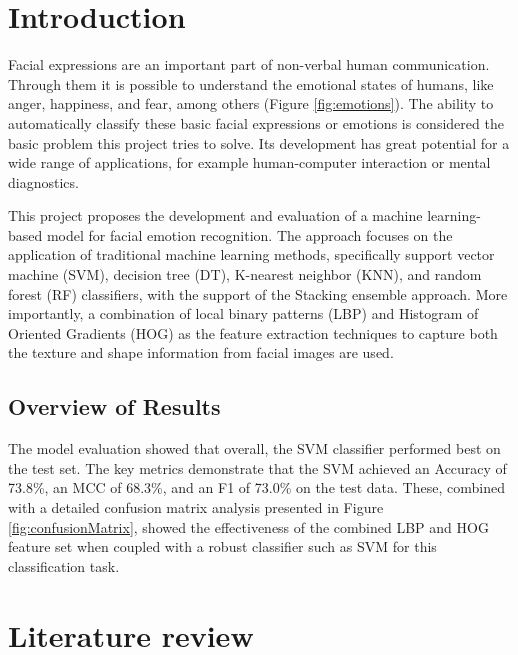 \chapter{Introduction}

Facial expressions are an important part of non-verbal human communication. Through them it is possible to understand the emotional states of humans, like anger, happiness, and fear, among others (Figure \ref{fig:emotions}). The ability to automatically classify these basic facial expressions or emotions is considered the basic problem this project tries to solve. Its development has great potential for a wide range of applications, for example human-computer interaction or mental diagnostics.

This project proposes the development and evaluation of a machine learning-based model for facial emotion recognition. The approach focuses on the application of traditional machine learning methods, specifically support vector machine (SVM), decision tree (DT), K-nearest neighbor (KNN), and random forest (RF) classifiers, with the support of the Stacking ensemble approach. More importantly, a combination of local binary patterns (LBP) and Histogram of Oriented Gradients (HOG) as the feature extraction techniques to capture both the texture and shape information from facial images are used.
\newline

\section{Overview of Results}

The model evaluation showed that overall, the SVM classifier performed best on the test set. The key metrics demonstrate that the SVM achieved an Accuracy of 73.8\%, an MCC of 68.3\%, and an F1 of 73.0\% on the test data. These, combined with a detailed confusion matrix analysis presented in Figure \ref{fig:confusionMatrix}, showed the effectiveness of the combined LBP and HOG feature set when coupled with a robust classifier such as SVM for this classification task.
\newline

\chapter{Literature review}

